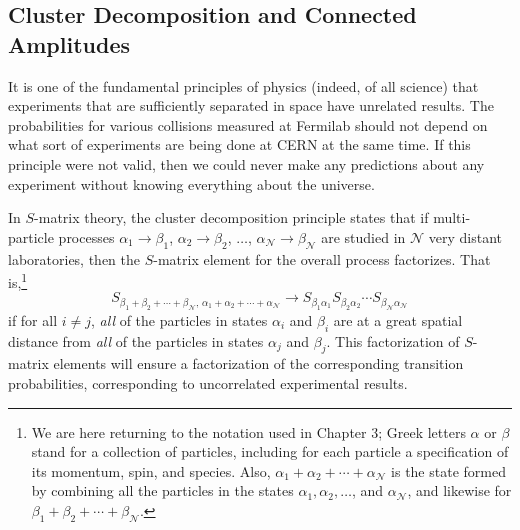 
\subsection{Cluster Decomposition and Connected Amplitudes}

It is one of the fundamental principles of physics (indeed, of all science)
that experiments that are sufficiently separated in space have unrelated
results. The probabilities for various collisions measured at Fermilab
should not depend on what sort of experiments are being done at CERN
at the same time. If this principle were not valid, then we could never
make any predictions about any experiment without knowing everything
about the universe.

In $S$-matrix theory, the cluster decomposition principle states that if
multi-particle processes $\alpha_1\to\beta_1$, $\alpha_2\to\beta_2$, $\ldots$,
$\alpha_{\mathcal N}\to\beta_{\mathcal N}$ are studied in $\mathcal N$
very distant laboratories, then the $S$-matrix element for the overall process
factorizes. That is,\footnote{We are here returning to the notation used in
Chapter 3; Greek letters $\alpha$ or $\beta$ stand for a collection of particles,
including for each particle a specification of its momentum, spin, and species.
Also, $\alpha_1+\alpha_2+\cdots+\alpha_{\mathcal N}$ is the state formed by
combining all the particles in the states $\alpha_1,\alpha_2,\ldots$, and
$\alpha_{\mathcal N}$, and likewise for
$\beta_1+\beta_2+\cdots+\beta_{\mathcal N}$.}
\begin{equation}
S_{\beta_1+\beta_2+\cdots+\beta_{\mathcal N},\,
   \alpha_1+\alpha_2+\cdots+\alpha_{\mathcal N}}
\longrightarrow
S_{\beta_1\alpha_1}S_{\beta_2\alpha_2}\cdots
S_{\beta_{\mathcal N}\alpha_{\mathcal N}}
\tag{4.3.1}
\label{eq:4.3.1}
\end{equation}
if for all $i\ne j$, \emph{all} of the particles in states $\alpha_i$ and
$\beta_i$ are at a great spatial distance from \emph{all} of the particles in
states $\alpha_j$ and $\beta_j$. This factorization of $S$-matrix elements will
ensure a factorization of the corresponding transition probabilities,
corresponding to uncorrelated experimental results.

